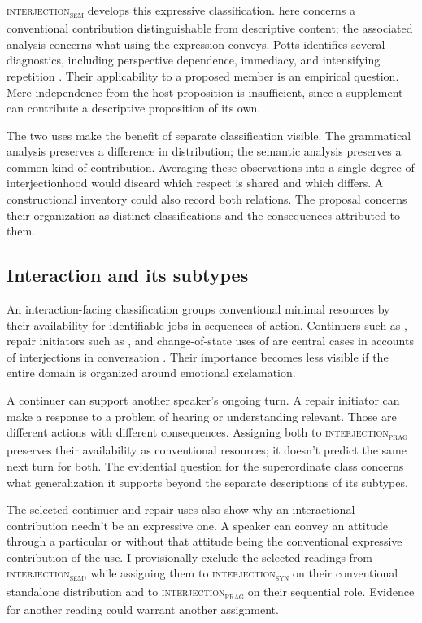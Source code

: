 \documentclass[12pt]{article}
\newcommand{\intj}[1]{\textsc{interjection\textsubscript{#1}}}
\begin{document}
\intj{sem} develops this expressive classification.  here
concerns a conventional contribution distinguishable from descriptive content;
the associated  analysis concerns what using the
expression conveys. Potts identifies several diagnostics, including
perspective dependence, immediacy, and intensifying repetition
\citep[166--167]{potts2007}. Their applicability to a proposed member is an
empirical question. Mere independence from the host proposition is
insufficient, since a supplement can contribute a descriptive proposition
of its own.

The two  uses make the benefit of separate classification
visible. The grammatical analysis preserves a difference in distribution;
the semantic analysis preserves a common kind of contribution. Averaging
these observations into a single degree of interjectionhood would discard
which respect is shared and which differs. A constructional inventory could
also record both relations. The proposal concerns their organization as
distinct classifications and the consequences attributed to them.

\subsection{Interaction and its subtypes}

An interaction-facing classification groups conventional minimal resources
by their availability for identifiable jobs in sequences of action.
Continuers such as , repair initiators such as ,
and change-of-state uses of  are central cases in accounts of
interjections in conversation \citep[257--259, 263--265]{dingemanse2024}.
Their importance becomes less visible if the entire domain is organized
around emotional exclamation.

A continuer can support another speaker's ongoing turn. A repair initiator
can make a response to a problem of hearing or understanding relevant.
Those are different actions with different consequences. Assigning both
to \intj{prag} preserves their availability as conventional resources;
it doesn't predict the same next turn for both. The evidential question
for the superordinate class concerns what generalization it supports beyond
the separate descriptions of its subtypes.

The selected continuer and repair uses also show why an interactional
contribution needn't be an expressive one. A speaker can convey an attitude
through a particular  or  without that attitude
being the conventional expressive contribution of the use. I provisionally
exclude the selected readings from \intj{sem}, while assigning them to
\intj{syn} on their conventional standalone distribution and to \intj{prag}
on their sequential role. Evidence for another reading could warrant another
assignment.
\end{document}
